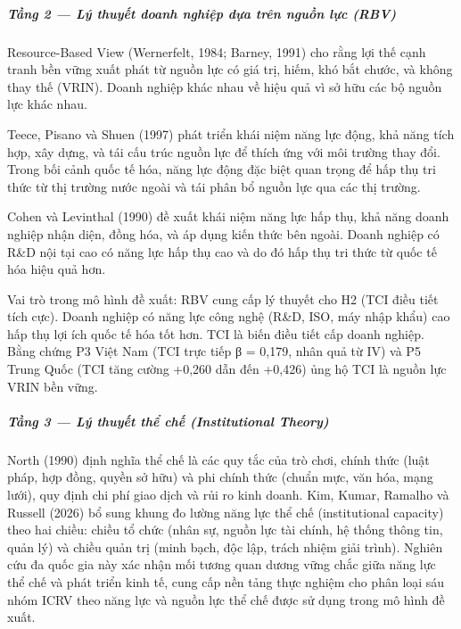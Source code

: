 \documentclass[12pt,a4paper]{article}
\begin{document}
\hypertarget{tux1ea7ng-2--luxfd-thuyux1ebft-doanh-nghiux1ec7p-dux1ef1a-truxean-nguux1ed3n-lux1ef1c-rbv}{%
\subparagraph{Tầng 2 --- Lý thuyết doanh nghiệp dựa trên nguồn lực
(RBV)}\label{tux1ea7ng-2--luxfd-thuyux1ebft-doanh-nghiux1ec7p-dux1ef1a-truxean-nguux1ed3n-lux1ef1c-rbv}}

Resource-Based View (Wernerfelt, 1984; Barney, 1991) cho rằng lợi thế
cạnh tranh bền vững xuất phát từ nguồn lực có giá trị, hiếm, khó bắt
chước, và không thay thế (VRIN). Doanh nghiệp khác nhau về hiệu quả vì
sở hữu các bộ nguồn lực khác nhau.

Teece, Pisano và Shuen (1997) phát triển khái niệm năng lực động, khả
năng tích hợp, xây dựng, và tái cấu trúc nguồn lực để thích ứng với môi
trường thay đổi. Trong bối cảnh quốc tế hóa, năng lực động đặc biệt quan
trọng để hấp thụ tri thức từ thị trường nước ngoài và tái phân bổ nguồn
lực qua các thị trường.

Cohen và Levinthal (1990) đề xuất khái niệm năng lực hấp thụ, khả năng
doanh nghiệp nhận diện, đồng hóa, và áp dụng kiến thức bên ngoài. Doanh
nghiệp có R\&D nội tại cao có năng lực hấp thụ cao và do đó hấp thụ tri
thức từ quốc tế hóa hiệu quả hơn.

Vai trò trong mô hình đề xuất: RBV cung cấp lý thuyết cho H2 (TCI điều
tiết tích cực). Doanh nghiệp có năng lực công nghệ (R\&D, ISO, máy nhập
khẩu) cao hấp thụ lợi ích quốc tế hóa tốt hơn. TCI là biến điều tiết cấp
doanh nghiệp. Bằng chứng P3 Việt Nam (TCI trực tiếp β = 0,179, nhân quả
từ IV) và P5 Trung Quốc (TCI tăng cường +0,260 dẫn đến +0,426) ủng hộ
TCI là nguồn lực VRIN bền vững.

\hypertarget{tux1ea7ng-3--luxfd-thuyux1ebft-thux1ec3-chux1ebf-institutional-theory}{%
\subparagraph{Tầng 3 --- Lý thuyết thể chế (Institutional
Theory)}\label{tux1ea7ng-3--luxfd-thuyux1ebft-thux1ec3-chux1ebf-institutional-theory}}

North (1990) định nghĩa thể chế là các quy tắc của trò chơi, chính thức
(luật pháp, hợp đồng, quyền sở hữu) và phi chính thức (chuẩn mực, văn
hóa, mạng lưới), quy định chi phí giao dịch và rủi ro kinh doanh. Kim,
Kumar, Ramalho và Russell (2026) bổ sung khung đo lường năng lực thể chế
(institutional capacity) theo hai chiều: chiều tổ chức (nhân sự, nguồn
lực tài chính, hệ thống thông tin, quản lý) và chiều quản trị (minh
bạch, độc lập, trách nhiệm giải trình). Nghiên cứu đa quốc gia này xác
nhận mối tương quan dương vững chắc giữa năng lực thể chế và phát triển
kinh tế, cung cấp nền tảng thực nghiệm cho phân loại sáu nhóm ICRV theo
năng lực và nguồn lực thể chế được sử dụng trong mô hình đề xuất.
\end{document}

